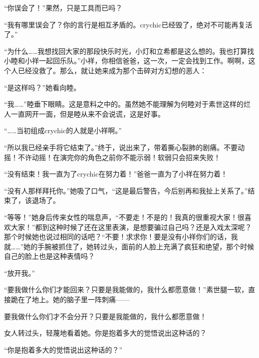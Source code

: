 \documentclass{article}
\begin{document}
“你误会了！”果然，只是工具而已吗？



“我有哪里误会了？你的言行是相互矛盾的。crychic已经毁了，绝对不可能再复活了。”



“为什么……我想找回大家的那段快乐时光，小灯和立希都是这么想的。我也打算找小睦和小祥一起回乐队。”小祥，你相信爸爸，这一次，一定会找到工作。啊啊，这个人已经没救了。那么，就让她来成为那个击碎对方幻想的恶人：



“是这样吗？”她看向睦。



“我……”睦垂下眼睛。这是意料之中的。虽然她不能理解为何睦对于素世这样的烂人一直网开一面，但是睦从来不会说谎，这是好事。



“……当初组成crychic的人就是小祥啊。”



“所以我已经亲手将它结束了。”终于，说出来了，带着撕心裂肺的剧痛。不要动摇！不许动摇！在演完你的角色之前你不能示弱！软弱只会招来失败！



“没有结束！我一直为了crychic在努力着！”爸爸一直为了小祥在努力着！



“没有人那样拜托你。”她吸了口气，“这是最后警告，今后别再和我扯上关系了。”结束了，该退场了。



“等等！”她身后传来女性的喘息声，“不要走！不是的！我真的很重视大家！很喜欢大家！”都到这种时候了还在这里表演，是想要骗过自己吗？还是入戏太深呢？那个时候她也说过相同的话吧？“不要！求求你！要是没有小祥你们的话，我就……”她的手腕被抓住了，她转过头，面前的人脸上充满了疯狂和绝望，那个时候自己的脸上也是这种表情吗？



“放开我。”



“要我做什么你们才能回来？只要是我能做的，我什么都愿意做！”素世腿一软，直接跪在了地上。她的脑子里一阵刺痛——



要我做什么你们才不会分开？只要是我能做的，我什么都愿意做！



女人转过头，轻蔑地看着她。你是抱着多大的觉悟说出这种话的？



“你是抱着多大的觉悟说出这种话的？”
\end{document}
